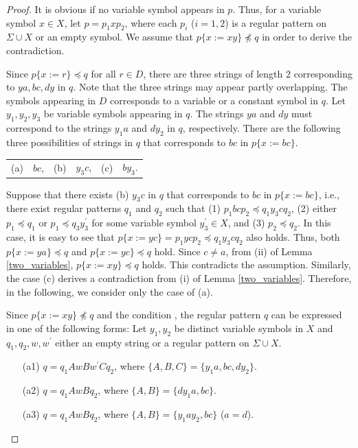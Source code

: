   \begin{proof}
  It is obvious if no variable symbol appears in $p$.
  Thus, for a variable symbol $x\in X$, let $p=p_{1}xp_{2}$, where each $p_{i}$ ($i=1,2$) is a regular pattern on $\Sigma\cup X$ or an empty symbol.
  We assume that $p \{ x := xy \} \not \preceq q$ in order to derive the contradiction.

  Since $p \{ x := r \} \preceq q$ for all $r \in D$, there are three strings of length $2$ corresponding to $ya, bc, dy$ in $q$.
  Note that the three strings may appear partly overlapping.
  The symbols appearing in $D$ corresponds to a variable or a constant symbol in $q$.
  Let $y_{1}, y_{2}, y_{3}$ be variable symbols appearing in $q$.
  The strings $ya$ and $dy$ must correspond to the strings $y_{1}a$ and $dy_{2}$ in $q$, respectively.
  There are the following three possibilities of strings in $q$ that corresponds to $bc$ in $p\{x:=bc\}$.
  \begin{center}
    \begin{tabular}{cccccc}
      \textrm{(a)} & $bc$, & \textrm{(b)} & $y_{3}c$, & \textrm{(c)} & $by_{3}$.
    \end{tabular}
  \end{center}

  Suppose that there exists (b) $y_{3}c$ in $q$ that corresponds to $bc$ in $p\{x:=bc\}$, i.e., there exist regular patterns $q_{1}$ and $q_{2}$ such that (1) $p_{1}bcp_{2} \preceq q_{1}y_{3}cq_{2}$, (2) either $p_{1} \preceq q_{1}$ or $p_{1} \preceq q_{3}y_{3}^{\prime}$ for some variable symbol $y_{3}^{\prime}\in X$, and (3) $p_{2} \preceq q_{2}$.
  In this case, it is easy to see that $p\{x:=yc\} = p_{1}ycp_{2} \preceq q_{1}y_{3}cq_{2}$ also holds. Thus, both $p\{x:=ya\}\preceq q$ and $p\{x:=yc\}\preceq q$ hold. Since $c\not= a$, from (ii) of Lemma \ref{two_variables}, $p\{x:=xy\}\preceq q$ holds. This contradicts the assumption. Similarly, the case (c) derives a contradiction from (i) of Lemma \ref{two_variables}.
  Therefore, in the following, we consider only the case of (a).

  Since $p \{ x := xy \} \not \preceq q$ and the condition \TheConditionA, the regular pattern $q$ can be expressed in one of the following forms: Let $y_{1}, y_{2}$ be distinct variable symbols in $X$ and $q_{1}, q_{2}, w, w^{\prime}$ either an empty string or a regular pattern on $\Sigma\cup X$.
  \begin{enumerate}
  \item[(a1)] $q=q_{1}AwBw^{\prime}Cq_{2}$, where $\{ A,B,C \} = \{ y_{1}a,bc,dy_{2} \}$.
  \item[(a2)] $q=q_{1}AwBq_{2}$, where $\{ A,B \} = \{ dy_{1}a,bc \}$.
  \item[(a3)] $q=q_{1}AwBq_{2}$, where $\{ A,B \} = \{ y_{1}ay_{2},bc \}$ ($a = d$).
  \end{enumerate}
  

\end{proof}
